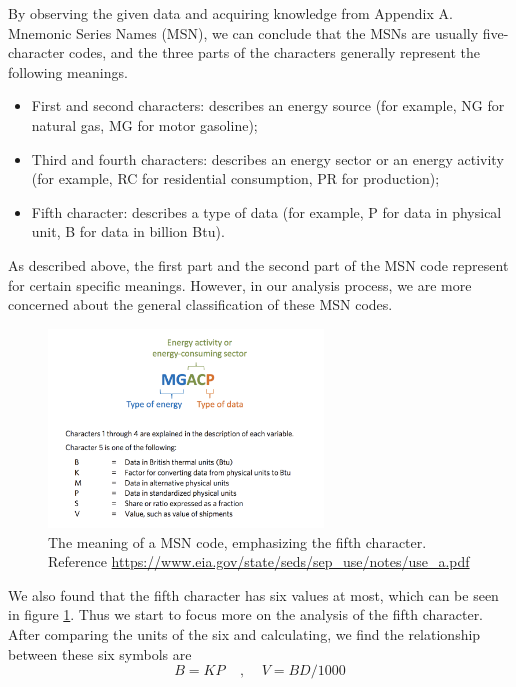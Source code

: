 \documentclass[a4paper,11pt]{article}
\begin{document}
\par By observing the given data and acquiring knowledge from Appendix A. Mnemonic Series Names (MSN)\cite{3}, we can conclude that the MSNs are usually five-character codes, and the three parts of the characters generally represent the following meanings.

\begin{itemize}
    \item First and second characters: describes an energy source (for example, NG for natural gas, MG for motor gasoline);
    \item Third and fourth characters: describes an energy sector or an energy activity (for example, RC for residential consumption, PR for production);
    \item Fifth character: describes a type of data (for example, P for data in physical unit, B for data in billion Btu). \cite{3}
\end{itemize}

\par As described above, the first part and the second part of the MSN code represent for certain specific meanings. However, in our analysis process, we are more concerned about the general classification of these MSN codes. 

\begin{figure}[h]%
    \centering 
    \includegraphics[width=0.65\textwidth]{./Pic/msn_5.png}
    \caption{The meaning of a MSN code, emphasizing the fifth character. Reference \url{https://www.eia.gov/state/seds/sep_use/notes/use_a.pdf}}
    \label{fig:msn_5}  
\end{figure}
\par We also found that the fifth character has six values at most, which can be seen in figure \ref{fig:msn_5}. Thus we start to focus more on the analysis of the fifth character. After comparing the units of the six and calculating, we find the relationship between these six symbols are
\begin{equation}
    B=KP~~~~~,~~~~~V=BD / 1000
\end{equation}
\end{document}

